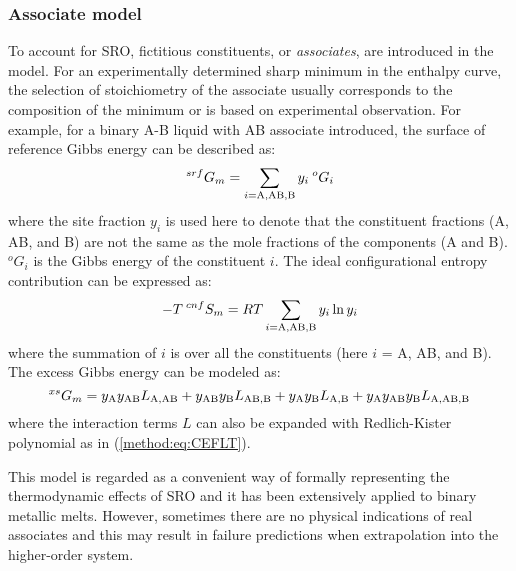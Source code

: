 \subsubsection{Associate model} \label{method:sssec:assm}
To account for SRO, fictitious constituents, or \textit{associates}, are introduced in the model. For an experimentally determined sharp minimum in the enthalpy curve, the selection of stoichiometry of the associate usually corresponds to the composition of the minimum or is based on experimental observation. For example, for a binary A-B liquid with AB associate introduced, the surface of reference Gibbs energy can be described as:
\begin{equation} \label{method:eq:assmGsrf}
    ^{srf}G_m=\sum_{i={\rm A,AB,B}} y_i\:^{o}G_{i}
\end{equation}
where the site fraction $y_i$ is used here to denote that the constituent fractions (A, AB, and B) are not the same as the mole fractions of the components (A and B). $^{o}G_{i}$ is the Gibbs energy of the constituent $i$. The ideal configurational entropy contribution can be expressed as:
\begin{equation} \label{method:eq:assmScnf}
    -T\:^{cnf}S_m=RT\sum_{i={\rm A,AB,B}}y_i\ln y_i
\end{equation}
where the summation of $i$ is over all the constituents (here $i$ = A, AB, and B). The excess Gibbs energy can be modeled as:
\begin{equation} \label{method:eq:assmGex}
    ^{xs}G_m=y_{\rm A}y_{\rm AB}L_{\rm A,AB}+y_{\rm AB}y_{\rm B}L_{\rm AB,B}+y_{\rm A}y_{\rm B}L_{\rm A,B}+y_{\rm A}y_{\rm AB}y_{\rm B}L_{\rm A,AB,B}
\end{equation}
where the interaction terms $L$ can also be expanded with Redlich-Kister polynomial \cite{redlich1948algebraic} as in (\ref{method:eq:CEFLT}).

This model is regarded as a convenient way of formally representing the thermodynamic effects of SRO \cite{sommer1982association} and it has been extensively applied to binary metallic melts. However, sometimes there are no physical indications of real associates and this may result in failure predictions when extrapolation into the higher-order system.

